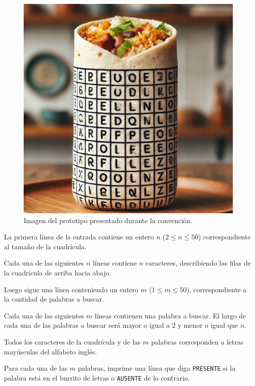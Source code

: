 \documentclass{oci}
\begin{document}
\begin{problemDescription}
  \begin{figure}
  \centering
  \includegraphics[scale=0.15]{burrito-1.png}
  \caption{Imagen del prototipo presentado durante la convención.}
  \end{figure}
\end{problemDescription}

\begin{inputDescription}
  La primera línea de la entrada contiene un entero $n$ ($2 \leq n \leq 50$) correspondiente
  al tamaño de la cuadrícula.

  Cada una de las siguientes $n$ líneas contiene $n$ caracteres, describiendo
  las filas de la cuadrícula de arriba hacia abajo.

  Luego sigue una línea conteniendo un entero $m$ ($1 \leq m \leq 50$), correspondiente
  a la cantidad de palabras a buscar.

  Cada una de las siguientes $m$ líneas contienen una palabra a buscar.
  El largo de cada una de las palabras a buscar será mayor o igual a 2 y menor o igual
  que $n$.

  Todos los caracteres de la cuadrícula y de las $m$ palabras corresponden a letras mayúsculas
  del alfabeto inglés.
\end{inputDescription}

\begin{outputDescription}
  Para cada una de las $m$ palabras, imprime una línea que diga \texttt{PRESENTE} si la palabra está
  en el burrito de letras o \texttt{AUSENTE} de lo contrario.
\end{outputDescription}
\end{document}
